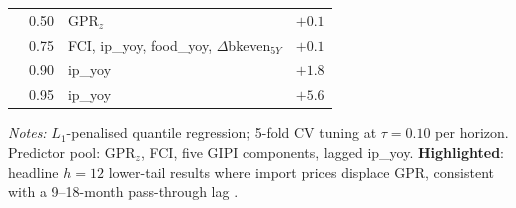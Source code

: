 \documentclass[12pt]{article}
\begin{document}
\begin{table}[htbp]
\begin{center}
\begin{threeparttable}
\begin{tabular}{@{}cc>{\raggedright\arraybackslash}p{6.2cm}r@{}}
 & 0.50 & GPR$_z$                                               & $+0.1$\\
 & 0.75 & FCI, ip\_yoy, food\_yoy, $\Delta$bkeven$_{5Y}$        & $+0.1$\\
 & 0.90 & ip\_yoy                                               & $+1.8$\\
 & 0.95 & ip\_yoy                                               & $+5.6$\\
\bottomrule
\end{tabular}
\begin{tablenotes}[flushleft]\footnotesize
\item \textit{Notes:}
$L_1$-penalised quantile regression; 5-fold CV tuning at $\tau=0.10$ per horizon.
Predictor pool: GPR$_z$, FCI, five GIPI components, lagged ip\_yoy.
\textbf{Highlighted}: headline $h=12$ lower-tail results where import prices displace GPR,
consistent with a 9--18-month pass-through lag \citep{conflitti2019}.
\end{tablenotes}
\end{threeparttable}
\end{center}\end{table}
\end{document}
